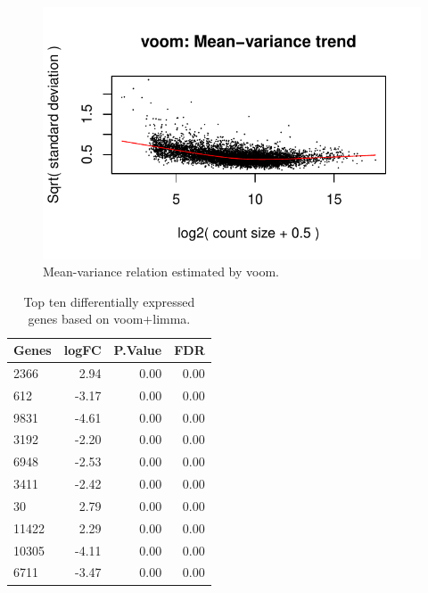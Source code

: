 \documentclass[a4paper,10pt]{article}\usepackage[]{graphicx}\usepackage[]{color}
\makeatletter
\def\maxwidth{ %
  \ifdim\Gin@nat@width>\linewidth
    \linewidth
  \else
    \Gin@nat@width
  \fi
}
\newenvironment{knitrout}{}{} %
\makeatother
\begin{document}
\begin{figure}[H]
\centering
\begin{knitrout}
\color{fgcolor}

{\centering \includegraphics[width=\maxwidth]{figures/plots-voom-var-1} 

}



\end{knitrout}
\caption{Mean-variance relation estimated by voom.}
\label{voom-var}
\end{figure}

\begin{table}[H]
\centering
\caption{Top ten differentially expressed genes
                            based on voom+limma.} 
\label{limma-top}
\begin{tabular}{lrrr}
  \hline
Genes & logFC & P.Value & FDR \\ 
  \hline
2366 & 2.94 & 0.00 & 0.00 \\ 
  612 & -3.17 & 0.00 & 0.00 \\ 
  9831 & -4.61 & 0.00 & 0.00 \\ 
  3192 & -2.20 & 0.00 & 0.00 \\ 
  6948 & -2.53 & 0.00 & 0.00 \\ 
  3411 & -2.42 & 0.00 & 0.00 \\ 
  30 & 2.79 & 0.00 & 0.00 \\ 
  11422 & 2.29 & 0.00 & 0.00 \\ 
  10305 & -4.11 & 0.00 & 0.00 \\ 
  6711 & -3.47 & 0.00 & 0.00 \\ 
   \hline
\end{tabular}
\end{table}
\end{document}
